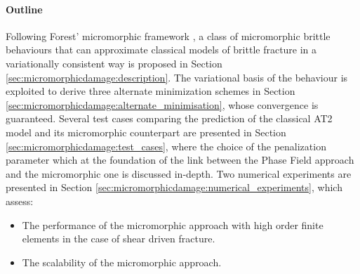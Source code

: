 \paragraph{Outline}

Following Forest' micromorphic framework
\cite{forest_micromorphic_2009, forest_nonlinear_2016}, a class of micromorphic
brittle behaviours that can approximate classical models of brittle
fracture in a variationally consistent way is proposed in
Section \ref{sec:micromorphicdamage:description}.
The variational basis of the behaviour is exploited to derive three alternate
minimization schemes in Section
\ref{sec:micromorphicdamage:alternate_minimisation}, whose convergence is guaranteed.
%
%
%
Several test cases comparing the prediction of the classical AT2 model
and its micromorphic counterpart are presented in Section
\ref{sec:micromorphicdamage:test_cases}, where
the choice of the penalization
parameter which at the foundation of the link between the Phase Field approach and the 
micromorphic one is discussed in-depth.
%
%
%
Two numerical experiments are presented in Section
\ref{sec:micromorphicdamage:numerical_experiments}, which assess:
%
%
%
\begin{itemize}
    \item The performance of the micromorphic approach with high order finite
    elements in the case of shear driven fracture.
    \item The scalability of the micromorphic approach.
\end{itemize}